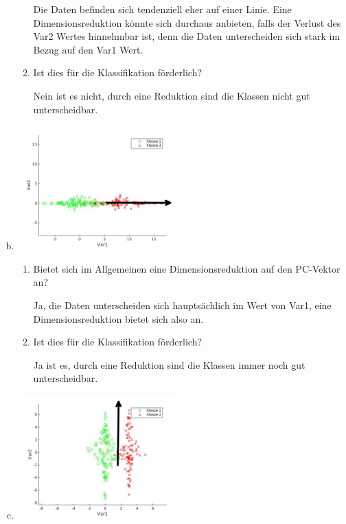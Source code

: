 \documentclass[a4paper]{scrartcl}
\begin{document}
\begin{enumerate}[(a)]
\begin{enumerate}[1.]
		Die Daten befinden sich tendenziell eher auf einer Linie. Eine Dimensionsreduktion könnte sich durchaus anbieten, falls der Verlust des Var2 Wertes hinnehmbar ist, denn die Daten unterscheiden sich stark im Bezug auf den Var1 Wert.
		
		\item Ist dies für die Klassifikation förderlich?
		
		Nein ist es nicht, durch eine Reduktion sind die Klassen nicht gut unterscheidbar.
		
	\end{enumerate}
	
	\item \hfill
	
	\includegraphics[width=0.5\textwidth]{data/img3_pc.jpg}
	
	\begin{enumerate}[1.]
		\item Bietet sich im Allgemeinen eine Dimensionsreduktion auf den PC-Vektor an?
		
		Ja, die Daten unterscheiden sich hauptsächlich im Wert von Var1, eine Dimensionsreduktion bietet sich also an.
		
		\item Ist dies für die Klassifikation förderlich?
		
		Ja ist es, durch eine Reduktion sind die Klassen immer noch gut unterscheidbar.
		
	\end{enumerate}
	
	\item \hfill
	
	\includegraphics[width=0.5\textwidth]{data/img4_pc.jpg}
	

\end{enumerate}
\end{document}
